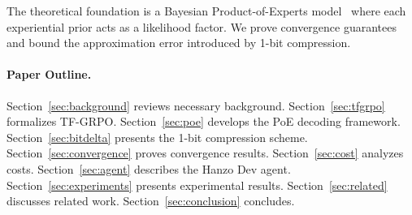 The theoretical foundation is a Bayesian Product-of-Experts
model~\cite{hinton2002training} where each experiential prior acts as a
likelihood factor. We prove convergence guarantees and bound the approximation
error introduced by 1-bit compression.

\paragraph{Paper Outline.}
Section~\ref{sec:background} reviews necessary background. Section~\ref{sec:tfgrpo}
formalizes TF-GRPO. Section~\ref{sec:poe} develops the PoE decoding framework.
Section~\ref{sec:bitdelta} presents the 1-bit compression scheme.
Section~\ref{sec:convergence} proves convergence results. Section~\ref{sec:cost}
analyzes costs. Section~\ref{sec:agent} describes the Hanzo Dev agent.
Section~\ref{sec:experiments} presents experimental results.
Section~\ref{sec:related} discusses related work. Section~\ref{sec:conclusion}
concludes.

